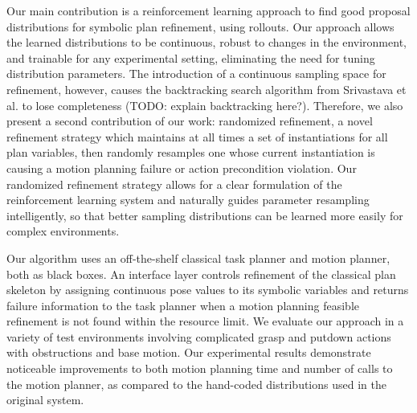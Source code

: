 Our main contribution is a reinforcement learning approach to find good proposal
distributions for symbolic plan refinement, using rollouts. Our approach allows
the learned distributions to be continuous, robust to changes in the environment, and
trainable for any experimental setting, eliminating the need for tuning distribution parameters. The
introduction of a continuous sampling space for refinement, however, causes the backtracking
search algorithm from Srivastava et al. to lose completeness (TODO: explain backtracking here?). Therefore, we also
present a second contribution of our work: randomized refinement, a novel refinement strategy
which maintains at all times a set of instantiations for all plan variables, then randomly
resamples one whose current instantiation is causing a motion planning failure or action precondition
violation. Our randomized refinement strategy allows for a clear formulation of the reinforcement
learning system and naturally guides parameter resampling intelligently, so that better
sampling distributions can be learned more easily for complex environments.

Our algorithm uses an off-the-shelf classical task planner and motion planner, both as black
boxes. An interface layer controls refinement of the classical plan skeleton by assigning continuous pose
values to its symbolic variables and returns failure information to the task planner
when a motion planning feasible refinement is not found within the resource limit. We evaluate
our approach in a variety of test environments involving complicated grasp and putdown
actions with obstructions and base motion. Our experimental results demonstrate noticeable
improvements to both motion planning time and number of calls to the motion planner, as compared
to the hand-coded distributions used in the original system.